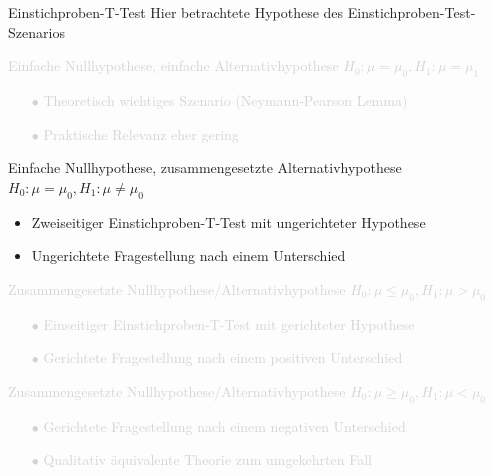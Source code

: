 \documentclass[
  8pt,
  ignorenonframetext,
]{beamer}
\begin{document}
\begin{frame}{Einstichproben-T-Test}
\protect\hypertarget{einstichproben-t-test-3}{}
Hier betrachtete Hypothese des Einstichproben-Test-Szenarios \small
{}

\textcolor{lightgray}{Einfache Nullhypothese, einfache Alternativhypothese $H_0:\mu = \mu_0, H_1:\mu = \mu_1$}

\begin{itemize}
\item[\textcolor{lightgray}{$\bullet$}] \textcolor{lightgray}{Theoretisch wichtiges Szenario (Neymann-Pearson Lemma)}
\item[\textcolor{lightgray}{$\bullet$}] \textcolor{lightgray}{Praktische Relevanz eher gering}
\end{itemize}

Einfache Nullhypothese, zusammengesetzte Alternativhypothese
\(H_0:\mu = \mu_0, H_1:\mu \neq \mu_0\)

\begin{itemize}
\item Zweiseitiger Einstichproben-T-Test mit ungerichteter Hypothese
\item Ungerichtete Fragestellung nach einem Unterschied
\end{itemize}

\textcolor{lightgray}{Zusammengesetzte Nullhypothese/Alternativhypothese $H_0:\mu \le \mu_0, H_1:\mu > \mu_0$}

\begin{itemize}
\item[\textcolor{lightgray}{$\bullet$}] \textcolor{lightgray}{Einseitiger Einstichproben-T-Test mit gerichteter Hypothese}
\item[\textcolor{lightgray}{$\bullet$}] \textcolor{lightgray}{Gerichtete Fragestellung nach einem positiven Unterschied}
\end{itemize}

\textcolor{lightgray}{Zusammengesetzte Nullhypothese/Alternativhypothese $H_0:\mu\ge\mu_0,H_1:\mu<\mu_0$}

\begin{itemize}
\item[\textcolor{lightgray}{$\bullet$}] \textcolor{lightgray}{Gerichtete Fragestellung nach einem negativen Unterschied}
\item[\textcolor{lightgray}{$\bullet$}] \textcolor{lightgray}{Qualitativ äquivalente Theorie zum umgekehrten Fall}
\end{itemize}
\end{frame}
\end{document}
